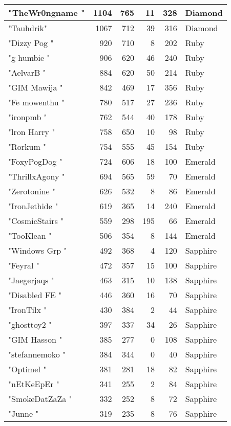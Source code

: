 \documentclass{article}
\begin{document}
\begin{table}[htbp]
\begin{tabular}{|l|r|r|r|r|l|}
"TheWr0ngname " & 1104 & 765 & 11 & 328 & Diamond \\ \hline
"Tauhdrik" & 1067 & 712 & 39 & 316 & Diamond \\ \hline
"Dizzy Pog " & 920 & 710 & 8 & 202 & Ruby \\ \hline
"g humbie " & 906 & 620 & 46 & 240 & Ruby \\ \hline
"AelvarB " & 884 & 620 & 50 & 214 & Ruby \\ \hline
"GIM Mawija " & 842 & 469 & 17 & 356 & Ruby \\ \hline
"Fe mowenthu " & 780 & 517 & 27 & 236 & Ruby \\ \hline
"ironpmb " & 762 & 544 & 40 & 178 & Ruby \\ \hline
"lron Harry " & 758 & 650 & 10 & 98 & Ruby \\ \hline
"Rorkum " & 754 & 555 & 45 & 154 & Ruby \\ \hline
"FoxyPogDog " & 724 & 606 & 18 & 100 & Emerald \\ \hline
"ThrillxAgony " & 694 & 565 & 59 & 70 & Emerald \\ \hline
"Zerotonine " & 626 & 532 & 8 & 86 & Emerald \\ \hline
"IronJethide " & 619 & 365 & 14 & 240 & Emerald \\ \hline
"CosmicStairs " & 559 & 298 & 195 & 66 & Emerald \\ \hline
"TooKlean " & 506 & 354 & 8 & 144 & Emerald \\ \hline
"Windows Grp " & 492 & 368 & 4 & 120 & Sapphire \\ \hline
"Feyral " & 472 & 357 & 15 & 100 & Sapphire \\ \hline
"Jaegerjaqs " & 463 & 315 & 10 & 138 & Sapphire \\ \hline
"Disabled FE " & 446 & 360 & 16 & 70 & Sapphire \\ \hline
"IronTilx " & 430 & 384 & 2 & 44 & Sapphire \\ \hline
"ghosttoy2 " & 397 & 337 & 34 & 26 & Sapphire \\ \hline
"GIM Hasson " & 385 & 277 & 0 & 108 & Sapphire \\ \hline
"stefannemoko " & 384 & 344 & 0 & 40 & Sapphire \\ \hline
"Optimel " & 381 & 281 & 18 & 82 & Sapphire \\ \hline
"nEtKeEpEr " & 341 & 255 & 2 & 84 & Sapphire \\ \hline
"SmokeDatZaZa " & 332 & 252 & 8 & 72 & Sapphire \\ \hline
"Junne " & 319 & 235 & 8 & 76 & Sapphire \\ \hline

\end{tabular}
\end{table}
\end{document}
